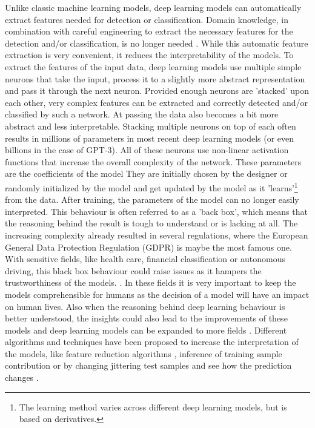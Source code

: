 \documentclass{article}
\begin{document}
Unlike classic machine learning models, deep learning models can automatically extract features needed for detection or classification.
Domain knowledge, in combination with careful engineering to extract the necessary features for the detection and/or classification, is no longer needed \cite{lecun_deep_2015}.
While this automatic feature extraction is very convenient, it reduces the interpretability of the models.
To extract the features of the input data, deep learning models use multiple simple neurons that take the input, process it to a slightly more abstract representation and pass it through the next neuron.
Provided enough neurons are 'stacked' upon each other, very complex features can be extracted and correctly detected and/or classified by such a network.
At passing the data also becomes a bit more abstract and less interpretable.
Stacking multiple neurons on top of each often results in millions of parameters in most recent deep learning models (or even billions in the case of GPT-3).
All of these neurons use  non-linear activation functions that increase the overall complexity of the network.
These parameters are the coefficients of the model
They are initially chosen by the designer or randomly initialized by the model and get updated by the model as it 'learns'\footnote{The learning method varies across different deep learning models, but is based on derivatives.} from the data.
After training, the parameters of the model can no longer easily interpreted.
This behaviour is often referred to as a 'back box', which means that the reasoning behind the result is tough to understand or is lacking at all.
The increasing complexity already resulted in several regulations, where the European General Data Protection Regulation (GDPR) is maybe the most famous one.
With sensitive fields, like health care, financial classification or autonomous driving, this black box behaviour could raise issues as it hampers the trustworthiness of the models. \cite{carvalho_machine_2019}.
In these fields it is very important to keep the models comprehensible for humans as the decision of a model will have an impact on human lives.
Also when the reasoning behind deep learning behaviour is better understood, the insights could also lead to the improvements of these models \cite{amershi_modeltracker_2015} and deep learning models can be expanded to more fields \cite{lei_opening_2018}.
Different algorithms and techniques have been proposed to increase the interpretation of the models, like feature reduction algorithms \cite{ribeiro_why_2016}, inference of training sample contribution \cite{koh_understanding_2020} or by changing jittering test samples and see how the prediction changes \cite{li_understanding_2017}.
\end{document}
